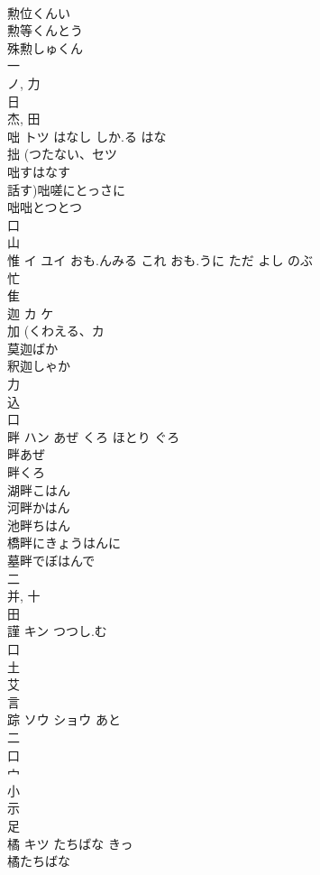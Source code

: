 \documentclass[8pt]{extreport}
\begin{document}
\begin{CJK}{UTF8}{min}
\\	勲位くんい
\\	勲等くんとう
\\	殊勲しゅくん
\\	一 
\\	ノ, 力 
\\	日 
\\	杰, 田 
\\	咄	トツ	はなし しか.る はな	
\\	拙 (つたない、セツ 
\\	咄すはなす
\\	話す)咄嗟にとっさに
\\	咄咄とつとつ
\\	口 
\\	山 
\\	惟	イ ユイ	おも.んみる これ おも.うに ただ よし のぶ	
\\	忙 
\\	隹 
\\	迦	カ ケ		
\\	加 (くわえる、カ 
\\	莫迦ばか
\\	釈迦しゃか
\\	力 
\\	込 
\\	口 
\\	畔	ハン	あぜ くろ ほとり ぐろ	
\\	畔あぜ 
\\	畔くろ 
\\	湖畔こはん 
\\	河畔かはん 
\\	池畔ちはん 
\\	橋畔にきょうはんに 
\\	墓畔でぼはんで 
\\	二 
\\	并, 十 
\\	田 
\\	謹	キン	つつし.む	
\\	口 
\\	土 
\\	艾 
\\	言 
\\	踪	ソウ ショウ	あと	
\\	二 
\\	口 
\\	宀 
\\	小 
\\	示 
\\	足 
\\	橘	キツ	たちばな きっ	
\\	橘たちばな 

\end{CJK}
\end{document}
